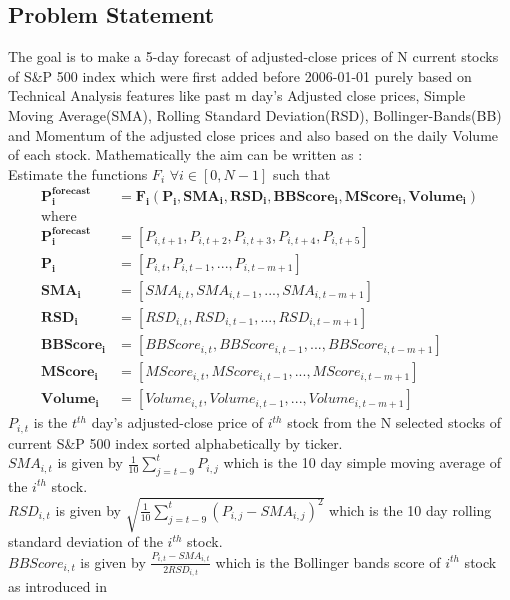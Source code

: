 \documentclass[10pt]{report}
\begin{document}
\subsection*{Problem Statement}
The goal is to make a 5-day forecast of adjusted-close prices\cite{adjclose} of N current stocks of S\&P 500 index which were first added before 2006-01-01 purely based on Technical Analysis features like past m day’s Adjusted close prices, Simple Moving Average(SMA), Rolling Standard Deviation(RSD), Bollinger-Bands(BB)\cite{bollingerbands} and Momentum of the adjusted close prices and also based on the daily Volume of each stock. Mathematically the aim can be written as :\\
Estimate the functions $F_i$ $\forall i \in [0,N-1]$ such that\\
\begin{align*}
\bm{P^{forecast}_{i}} &= \bm{F_i}(\bm{P_i}, \bm{SMA_i}, \bm{RSD_i}, \bm{BBScore_i}, \bm{MScore_i},\bm{ Volume_i})\\
\text{where}\\
\bm{P^{forecast}_{i}} &= [ P_{i, t+1}, P_{i, t+2}, P_{i, t+3}, P_{i, t+4}, P_{i, t+5} ] \\
\bm{P_i} &= [ P_{i, t}, P_{i, t-1}, ..., P_{i, t-m+1} ] \\
\bm{SMA_i} &= [ SMA_{i, t}, SMA_{i, t-1}, ..., SMA_{i, t-m+1} ]\\
\bm{RSD_i} &= [ RSD_{i, t}, RSD_{i, t-1}, ..., RSD_{i, t-m+1} ]\\
\bm{BBScore_i} &= [ BBScore_{i, t}, BBScore_{i, t-1}, ..., BBScore_{i, t-m+1} ]\\
\bm{MScore_i} &= [ MScore_{i, t}, MScore_{i, t-1}, ..., MScore_{i, t-m+1} ]\\
\bm{Volume_i} &= [ Volume_{i, t}, Volume_{i, t-1}, ..., Volume_{i, t-m+1} ]
\end{align*}
$P_{i,t}$ is the $t^{th}$ day's adjusted-close price of $i^{th}$ stock from the N selected stocks of current S\&P 500 index sorted alphabetically by ticker.\\
$SMA_{i,t}$ is given by $\frac{1}{10}\sum_{j=t-9}^{t} P_{i,j}$ which is the 10 day simple moving average of the $i^{th}$ stock.\\
$RSD_{i,t}$ is given by $\sqrt{\frac{1}{10}\sum_{j=t-9}^{t} \left( P_{i,j} - SMA_{i,j}\right)^2}$ which is the 10 day rolling standard deviation of the $i^{th}$ stock.\\
$BBScore_{i,t}$ is given by $\frac{P_{i,t} - SMA_{i,t}}{2 RSD_{i,t}}$ which is the Bollinger bands score of $i^{th}$ stock as introduced in \cite{mlfortrading} \\
\end{document}
